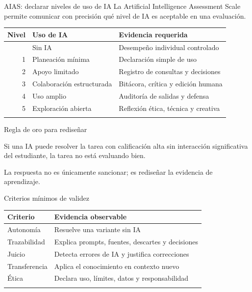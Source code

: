 \documentclass[
  ignorenonframetext,
  aspectratio=169,
  spanish,
]{beamer}
\newcounter{none} %
\begin{document}
\begin{frame}{AIAS: declarar niveles de uso de IA}
\protect{}\label{aias-declarar-niveles-de-uso-de-ia}
La Artificial Intelligence Assessment Scale permite comunicar con
precisión qué nivel de IA es aceptable en una evaluación.

{\def\LTcaptype{none} %
\begin{longtable}[]{@{}rll@{}}
\toprule\noalign{}
Nivel & Uso de IA & Evidencia requerida \\
\midrule\noalign{}
\endhead
0 & Sin IA & Desempeño individual controlado \\
1 & Planeación mínima & Declaración simple de uso \\
2 & Apoyo limitado & Registro de consultas y decisiones \\
3 & Colaboración estructurada & Bitácora, crítica y edición humana \\
4 & Uso amplio & Auditoría de salidas y defensa \\
5 & Exploración abierta & Reflexión ética, técnica y creativa \\
\bottomrule\noalign{}
\end{longtable}
}
\end{frame}

\begin{frame}{Regla de oro para rediseñar}
\protect{}\label{regla-de-oro-para-rediseuxf1ar}
\begin{tcolorbox}[enhanced jigsaw, arc=.35mm, bottomrule=.15mm, breakable, colback=white, colframe=quarto-callout-color-frame, left=2mm, leftrule=.75mm, opacityback=0, rightrule=.15mm, toprule=.15mm]

Si una IA puede resolver la tarea con calificación alta sin interacción
significativa del estudiante, la tarea no está evaluando bien.

\end{tcolorbox}

La respuesta no es únicamente sancionar; es rediseñar la evidencia de
aprendizaje.
\end{frame}

\begin{frame}{Criterios mínimos de validez}
\protect{}\label{criterios-muxednimos-de-validez}
{\def\LTcaptype{none} %
\begin{longtable}[]{@{}ll@{}}
\toprule\noalign{}
Criterio & Evidencia observable \\
\midrule\noalign{}
\endhead
Autonomía & Resuelve una variante sin IA \\
Trazabilidad & Explica prompts, fuentes, descartes y decisiones \\
Juicio & Detecta errores de IA y justifica correcciones \\
Transferencia & Aplica el conocimiento en contexto nuevo \\
Ética & Declara uso, límites, datos y responsabilidad \\
\bottomrule\noalign{}
\end{longtable}
}
\end{frame}
\end{document}
